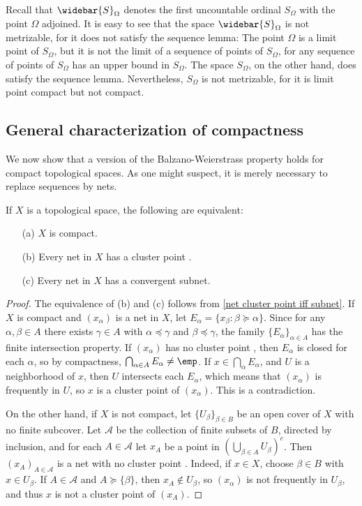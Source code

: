 \begin{example}
Recall that $\widebar{S}_\Omega$ denotes the first uncountable ordinal $S_\Omega$ with the point $\Omega$ adjoined. It is easy to see that the space $\widebar{S}_\Omega$ is not metrizable, for it does not satisfy the sequence lemma: The point $\Omega$ is a limit point of $S_\Omega$, but it is not the limit of a sequence of points of $S_\Omega$, for any sequence of points of $S_\Omega$ has an upper bound in $S_\Omega$. The space $S_\Omega$, on the other hand, does satisfy the sequence lemma. Nevertheless, $S_\Omega$ is not metrizable, for it is limit point compact but not compact.
\end{example}
\subsection{General characterization of compactness}
We now show that a version of the Balzano-Weierstrass property holds for compact topological spaces. As one might suspect, it is merely necessary to replace sequences by nets.
\begin{theorem}\label{compact iff net}
If $X$ is a topological space, the following are equivalent:
\begin{itemize}
\item[(a)] $X$ is compact.
\item[(b)] Every net in $X$ has a cluster point .
\item[(c)] Every net in $X$ has a convergent subnet.
\end{itemize}
\end{theorem}
\begin{proof}
The equivalence of (b) and (c) follows from \cref{net cluster point iff subnet}. If $X$ is compact and $(x_\alpha)$ is a net in $X$, let $E_\alpha=\{x_\beta:\beta\succeq\alpha\}$. Since for any $\alpha,\beta\in A$ there exists $\gamma\in A$ with $\alpha\preceq\gamma$ and $\beta\preceq\gamma$, the family $\{E_\alpha\}_{\alpha\in A}$ has the finite intersection property. If $(x_\alpha)$ has no cluster point , then $E_\alpha$ is closed for each $\alpha$, so by compactness, $\bigcap_{\alpha\in A}E_\alpha\neq\emp$. If $x\in\bigcap_\alpha E_\alpha$, and $U$ is a neighborhood of $x$, then $U$ intersects each $E_\alpha$, which means that $(x_\alpha)$ is frequently in $U$, so $x$ is a cluster point  of $(x_\alpha)$. This is a contradiction.\par
On the other hand, if $X$ is not compact, let $\{U_\beta\}_{\beta\in B}$ be an open cover of $X$ with no finite subcover. Let $\mathcal{A}$ be the collection of finite subsets of $B$, directed by inclusion, and for each $A\in\mathcal{A}$ let $x_A$ be a point in $(\bigcup_{\beta\in A}U_\beta)^c$. Then $(x_A)_{A\in\mathcal{A}}$ is a net with no cluster point . Indeed, if $x\in X$, choose $\beta\in B$ with $x\in U_\beta$. If $A\in\mathcal{A}$ and $A\succeq\{\beta\}$, then $x_A\notin U_\beta$, so $(x_\alpha)$ is not frequently in $U_\beta$, and thus $x$ is not a cluster point  of $(x_A)$.
\end{proof}

